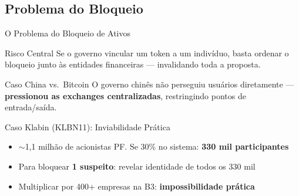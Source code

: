 \documentclass{libs/ufc_format}
\begin{document}
\subsection{Problema do Bloqueio}
\begin{frame}{O Problema do Bloqueio de Ativos}
    \begin{alertblock}{Risco Central}
        Se o governo vincular um token a um indivíduo, basta ordenar o bloqueio junto às entidades financeiras --- invalidando toda a proposta.
    \end{alertblock}

    \vspace{0.2cm}

    \begin{block}{Caso China vs.\ Bitcoin \cite{china2021}}
        O governo chinês não perseguiu usuários diretamente --- \textbf{pressionou as exchanges centralizadas}, restringindo pontos de entrada/saída.
    \end{block}

    \vspace{0.2cm}

    \begin{exampleblock}{Caso Klabin (KLBN11): Inviabilidade Prática}
        \begin{itemize}
            \item $\sim$1,1 milhão de acionistas PF. Se 30\% no sistema: \textbf{330 mil participantes}
            \item Para bloquear \textbf{1 suspeito}: revelar identidade de todos os 330 mil
            \item Multiplicar por 400+ empresas na B3: \textbf{impossibilidade prática}
        \end{itemize}
    \end{exampleblock}
\end{frame}
\end{document}
